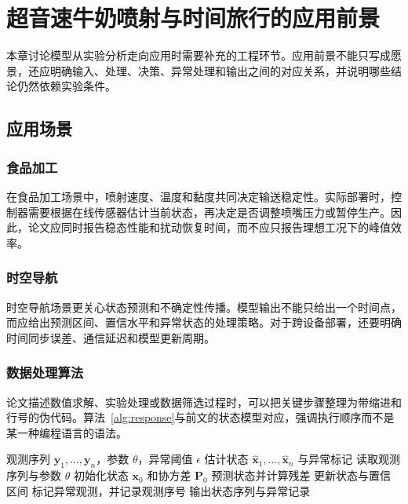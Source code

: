 \chapter{超音速牛奶喷射与时间旅行的应用前景}

本章讨论模型从实验分析走向应用时需要补充的工程环节。应用前景不能只写成愿景，还应明确输入、处理、决策、异常处理和输出之间的对应关系，并说明哪些结论仍然依赖实验条件。

\section{应用场景}

\subsection{食品加工}

在食品加工场景中，喷射速度、温度和黏度共同决定输送稳定性。实际部署时，控制器需要根据在线传感器估计当前状态，再决定是否调整喷嘴压力或暂停生产。因此，论文应同时报告稳态性能和扰动恢复时间，而不应只报告理想工况下的峰值效率。

\subsection{时空导航}

时空导航场景更关心状态预测和不确定性传播。模型输出不能只给出一个时间点，而应给出预测区间、置信水平和异常状态的处理策略。对于跨设备部署，还要明确时间同步误差、通信延迟和模型更新周期。

\subsection{数据处理算法}

论文描述数值求解、实验处理或数据筛选过程时，可以把关键步骤整理为带缩进和行号的伪代码。算法~\ref{alg:response}与前文的状态模型对应，强调执行顺序而不是某一种编程语言的语法。
\begin{algorithm}[htbp]
  \caption{概率响应估计算法}
  \label{alg:response}
  \begin{algorithmic}[1]
    \REQUIRE 观测序列 $\bm{y}_1,\ldots,\bm{y}_n$，参数 $\theta$，异常阈值 $\epsilon$
    \ENSURE 估计状态 $\hat{\bm{x}}_1,\ldots,\hat{\bm{x}}_n$ 与异常标记
    \STATE 读取观测序列与参数 $\theta$
    \STATE 初始化状态 $\bm{x}_0$ 和协方差 $\bm{P}_0$
      \STATE 预测状态并计算残差
      \STATE 更新状态与置信区间
        \STATE 标记异常观测，并记录观测序号
      \ENDIF
    \ENDFOR
    \STATE 输出状态序列与异常记录
  \end{algorithmic}
\end{algorithm}

